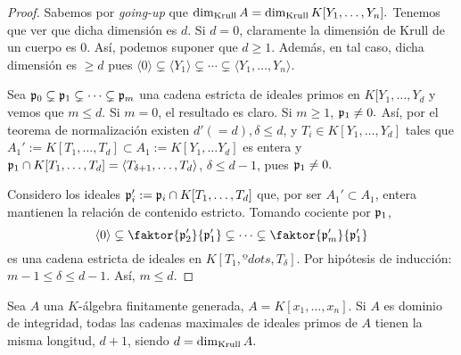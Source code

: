 \documentclass[../main.tex]{subfiles}
\begin{document}
\begin{proof}
	Sabemos por \textit{going-up} que $\dim_{\text{Krull}} A=\dim_{\text{Krull}} {K[Y_1,\dots,Y_n]}.$ Tenemos que ver que dicha dimensión es $d.$ Si $d=0$, claramente la dimensión de Krull de un cuerpo es $0.$ Así, podemos suponer que $d\ge 1.$ Además, en tal caso, dicha dimensión es $\ge d$ pues $\langle 0\rangle\subsetneq\langle Y_1\rangle\subsetneq\cdots\subsetneq\langle Y_1,\dots, Y_n\rangle.$
	
	Sea $\mathfrak{p}_0\subsetneq\mathfrak{p}_1\subsetneq\cdots\subsetneq\mathfrak{p}_m$ una cadena estricta de ideales primos en $K[Y_1,\dots,Y_d$ y vemos que $m\le d.$ Si $m=0$, el resultado es claro. Si $m\ge 1$, $\mathfrak{p}_1\neq 0.$ Así, por el teorema de normalización existen $d'(=d), \delta\le d$, y $T_i\in K[Y_1,\dots,Y_d]$ tales que $A_1':=K[T_1,\dots,T_d]\subset A_1:=K[Y_1,\dots Y_d]$ es entera y $\mathfrak{p}_1\cap K[T_1,\dots, T_d]=\langle T_{\delta+1},\dots,T_d\rangle$, $\delta\le d-1$, pues $\mathfrak{p}_1\neq 0.$ 
	
	Considero los ideales $\mathfrak{p}_i':=\mathfrak{p}_i\cap K[T_1,\dots,T_d]$ que, por ser $A_1'\subset A_1$, entera mantienen la relación de contenido estricto. Tomando cociente por $\mathfrak{p}_1$,
	$$\langle 0\rangle\subsetneq \faktor{\p_2'}{\p_1'}\subsetneq\cdots\subsetneq\faktor{\p_m'}{\p_1'}$$
	es una cadena estricta de ideales en $K[T_1,ºdots, T_\delta].$ Por hipótesis de inducción: $m-1\le\delta\le d-1.$ Así, $m\le d.$
\end{proof}

\begin{theorem}
	Sea $A$ una $K$-álgebra finitamente generada, $A=K[x_1,\dots, x_n]$. Si $A$ es dominio de integridad, todas las cadenas maximales de ideales primos de $A$ tienen la misma longitud, $d+1$, siendo $d=\dim_{\text{Krull}} A.$
\end{theorem}
\end{document}
